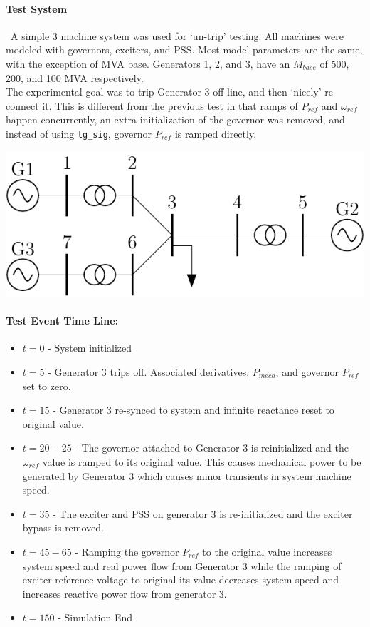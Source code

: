 \documentclass[12pt]{article}
\begin{document}
\onehalfspacing

\paragraph{Test System}\ A simple 3 machine system was used for `un-trip' testing.
All machines were modeled with governors, exciters, and PSS.
Most model parameters are the same, with the exception of MVA base.
Generators 1, 2, and 3, have an $M_{base}$ of 500, 200, and 100 MVA respectively. \\
The experimental goal was to trip Generator 3 off-line, and then `nicely' re-connect it.
This is different from the previous test in that ramps of $P_{ref}$ and $\omega_{ref}$ happen concurrently, an extra initialization of the governor was removed, and instead of using \verb|tg_sig|, governor $P_{ref}$ is ramped directly.

\begin{center}
\includegraphics[width=.6\linewidth]{200831-3mach7bus}
\end{center}

\paragraph{Test Event Time Line:}
\begin{itemize}
 em
\item $t=0$ - System initialized
\item $t=5$ - Generator 3 trips off.
Associated derivatives, $P_{mech}$, and governor $P_{ref}$ set to zero.
\item $t=15$ - Generator 3 re-synced to system and infinite reactance reset to original value. 

\item $t=20-25$ - The governor attached to Generator 3 is reinitialized and the $\omega_{ref}$ value is ramped to its original value. 
This causes mechanical power to be generated by Generator 3 which causes minor transients in system machine speed.
\item $t=35$ - The exciter and PSS on generator 3 is re-initialized and the exciter bypass is removed.
\item $t=45-65$ - Ramping the governor $P_{ref}$ to the original value increases system speed  and real power flow from Generator 3 while the ramping of exciter reference voltage to original its value decreases system speed and increases reactive power flow from generator 3.
\item $t=150$ - Simulation End
\end{itemize}
\end{document}
